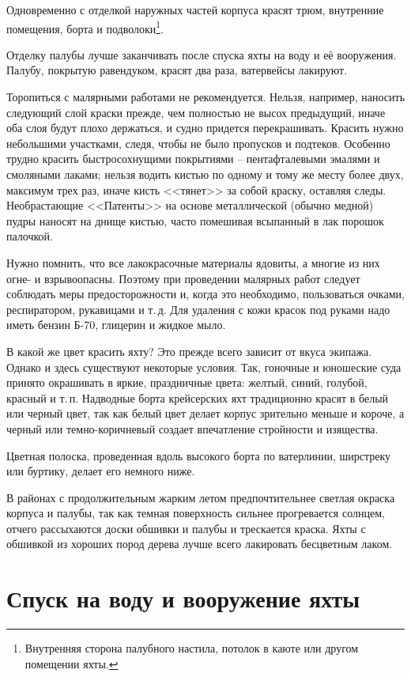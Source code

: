 \documentclass[a4paper, 12pt, twoside, final]{scrbook}
\begin{document}
Одновременно с отделкой наружных частей корпуса красят трюм, внутренние помещения, борта и подволоки\footnote{Внутренняя сторона палубного настила, потолок в каюте или другом помещении яхты.}.

Отделку палубы лучше заканчивать после спуска яхты на воду и её вооружения. Палубу, покрытую равендуком, красят два раза, ватервейсы лакируют.

Торопиться с малярными работами не рекомендуется. Нельзя, например, наносить следующий слой краски прежде, чем полностью не высох предыдущий, иначе оба слоя будут плохо держаться, и судно придется перекрашивать. Красить нужно небольшими участками, следя, чтобы не было пропусков и подтеков. Особенно трудно красить быстросохнущими покрытиями \--- пентафталевыми эмалями и смоляными лаками; нельзя водить кистью по одному и тому же месту более двух, максимум трех раз, иначе кисть <<тянет>> за собой краску, оставляя следы. Необрастающие <<Патенты>> на основе металлической (обычно медной) пудры наносят на днище кистью, часто помешивая всыпанный в лак порошок палочкой.

Нужно помнить, что все лакокрасочные материалы ядовиты, а многие из них огне- и взрывоопасны. Поэтому при проведении малярных работ следует соблюдать меры предосторожности и, когда это необходимо, пользоваться очками, респиратором, рукавицами и т.\,д. Для удаления с кожи красок под руками надо иметь бензин Б-70, глицерин и жидкое мыло.

В какой же цвет красить яхту? Это прежде всего зависит от вкуса экипажа. Однако и здесь существуют некоторые условия. Так, гоночные и юношеские суда принято окрашивать в яркие, праздничные цвета: желтый, синий, голубой, красный и т.\,п. Надводные борта крейсерских яхт традиционно красят в белый или черный цвет, так как белый цвет делает корпус зрительно меньше и короче, а черный или темно-коричневый создает впечатление стройности и изящества.

Цветная полоска, проведенная вдоль высокого борта по ватерлинии, ширстреку или буртику, делает его немного ниже.

В районах с продолжительным жарким летом предпочтительнее светлая окраска корпуса и палубы, так как темная поверхность сильнее прогревается солнцем, отчего рассыхаются доски обшивки и палубы и трескается краска.
Яхты с обшивкой из хороших пород дерева лучше всего лакировать бесцветным лаком.

\section{Спуск на воду и вооружение яхты}
\end{document}
